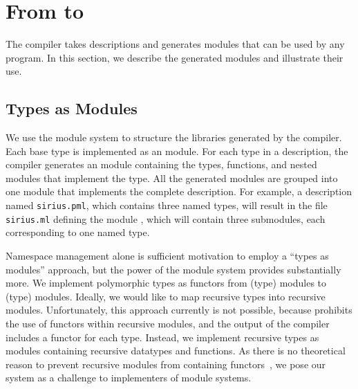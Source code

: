 \section{From \padsmlbig{} to \ocamlbig{}}
\label{sec:padsml-impl}
The \padsml{} compiler takes descriptions and generates \ocaml{}
modules that can be used by any \ocaml{} program.  In this section, we
describe the generated modules and illustrate their use.

\subsection{Types as Modules}
\label{sec:gen-code}

We use the \ocaml{} module system to structure the libraries generated
by the \padsml{} compiler.  Each \padsml{} base type is implemented as
an \ocaml{} module.  For each \padsml{} type in a description, the
\padsml{} compiler generates an \ocaml{} module containing the types,
functions, and nested modules that implement the \padsml{} type.  All
the generated modules are grouped into one module that implements the
complete description.  For example, a \padsml{} description named
\texttt{sirius.pml}, which contains three named types, will result in the
\ocaml{} file \texttt{sirius.ml} defining the module ,
which will contain three submodules, each corresponding to one named type.

Namespace management alone is sufficient motivation to employ a
``types as modules'' approach, but the power of the \ml{} module
system provides substantially more.  We implement polymorphic
\padsml{} types as functors from (type) modules to (type) modules.
Ideally, we would like to map recursive \padsml{} types into recursive
modules.  Unfortunately, this approach currently is not possible, because
\ocaml{} prohibits the use of functors within recursive modules,
and the output of the \padsml{} compiler includes a functor for each
type.  Instead, we implement recursive types as modules containing
recursive datatypes and functions.  As there is no theoretical reason
to prevent recursive modules from containing functors~\cite{dreyer-thesis}, we
pose our system as a challenge to implementers of module systems.

